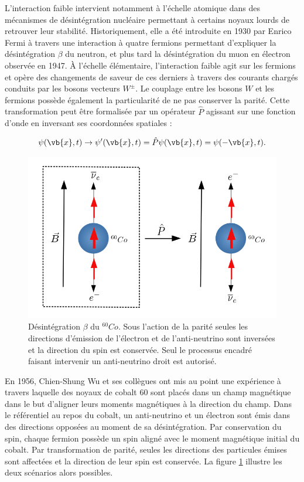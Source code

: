         L'interaction faible intervient notamment à l'échelle atomique dans des mécanismes de désintégration nucléaire permettant à certains noyaux lourds de retrouver leur stabilité. Historiquement, elle a été introduite en 1930 par Enrico Fermi à travers une interaction à quatre fermions permettant d'expliquer la désintégration $\beta$ du neutron, et plus tard la désintégration du muon en électron observée en 1947. À l'échelle élémentaire, l'interaction faible agit sur les fermions et opère des changements de saveur de ces derniers à travers des courants chargés conduits par les bosons vecteurs $W^{\pm}$. Le couplage entre les bosons $W$ et les fermions possède également la particularité de ne pas conserver la parité. Cette transformation peut être formalisée par un opérateur $\hat{P}$ agissant sur une fonction d'onde en inversant ses coordonnées spatiales : 

        $$\psi(\vb{x},t)\rightarrow\psi'(\vb{x},t)=\hat{P}\psi(\vb{x},t)=\psi(-\vb{x},t).$$

        \begin{figure}
        \centering
            \includegraphics[scale=0.35]{Chapitre2/Images/wuexp.png} 
            \caption{Désintégration $\beta$ du $^{60}Co$. Sous l'action de la parité seules les directions d'émission de l'électron et de l'anti-neutrino sont inversées et la direction du spin est conservée. Seul le processus encadré faisant intervenir un anti-neutrino droit est autorisé.}
        \label{wuexp}
        \end{figure}

        En 1956, Chien-Shung Wu et ses collègues ont mis au point une expérience à travers laquelle des noyaux de cobalt 60 sont placés dans un champ magnétique dans le but d'aligner leurs moments magnétiques à la direction du champ. Dans le référentiel au repos du cobalt, un anti-neutrino et un électron sont émis dans des directions opposées au moment de sa désintégration. Par conservation du spin, chaque fermion possède un spin aligné avec le moment magnétique initial du cobalt. Par transformation de parité, seules les directions des particules émises sont affectées et la direction de leur spin est conservée. La figure \ref{wuexp} illustre les deux scénarios alors possibles. 

